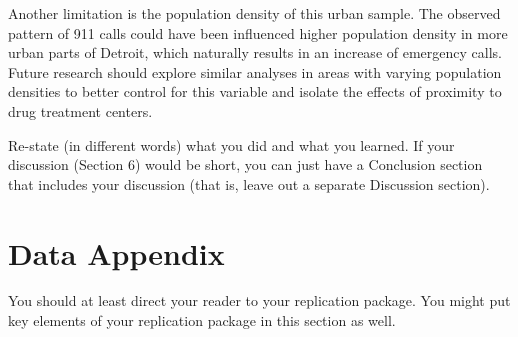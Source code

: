 \documentclass[12pt]{article}
\begin{document}
    Another limitation is the population density of this urban sample. The observed pattern of 911 calls could have been influenced higher population density in more urban parts of Detroit, which naturally results in an increase of emergency calls. Future research should explore similar analyses in areas with varying population densities to better control for this variable and isolate the effects of proximity to drug treatment centers. 

 
Re-state (in different words) what you did and what you learned. If your discussion (Section 6) would be short, you can just have a Conclusion section that includes your discussion (that is, leave out a separate Discussion section).

\newpage
\singlespacing
\setlength\bibsep{0pt}





\newpage
\section*{Data Appendix} \label{sec:appendixa}

You should at least direct your reader to your replication package. You might put key elements of your replication package in this section as well.
\end{document}
